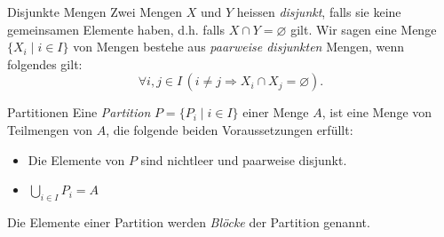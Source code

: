 \begin{definition}{Disjunkte Mengen}
 Zwei Mengen $X$ und $Y$ heissen \textit{disjunkt}, falls sie keine gemeinsamen Elemente haben, d.h. falls $X\cap Y=\varnothing$ gilt. Wir sagen eine Menge $\{X_i\mid i\in I \}$ von Mengen bestehe aus \textit{paarweise disjunkten} Mengen, wenn folgendes gilt:
 \[
 \forall i,j\in I\,(i\neq j\Rightarrow X_i\cap X_j=\varnothing).
 \]
\end{definition}

\begin{definition}{Partitionen}
Eine \textit{Partition} $P=\{P_i\mid i\in I \}$ einer Menge $A$, ist eine Menge von Teilmengen von $A$, die folgende beiden Voraussetzungen erfüllt:
\begin{itemize}
\item Die Elemente von $P$ sind nichtleer und paarweise disjunkt.
\item $\bigcup_{i\in I}P_i=A$
\end{itemize}
Die Elemente einer Partition werden \textit{Blöcke} der Partition genannt.
\end{definition}


